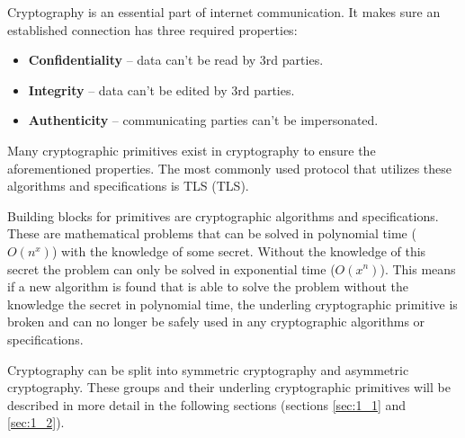 
Cryptography is an essential part of internet communication. It makes sure an established connection has three required properties\cite{Bernstein149}:
\begin{itemize}
  \item \textbf{Confidentiality} -- data can't be read by 3rd parties.
  \item \textbf{Integrity} -- data can't be edited by 3rd parties.
  \item \textbf{Authenticity} -- communicating parties can't be impersonated.
\end{itemize}
Many cryptographic primitives exist in cryptography to ensure the aforementioned properties. The most commonly used protocol that utilizes these algorithms and specifications is TLS (\acl{TLS}).

Building blocks for primitives are cryptographic algorithms and specifications. These are mathematical problems that can be solved in polynomial time ($O(n^x)$) with the knowledge of some secret. Without the knowledge of this secret the problem can only be solved in exponential time ($O(x^n)$). This means if a new algorithm is found that is able to solve the problem without the knowledge the secret in polynomial time, the underling cryptographic primitive is broken and can no longer be safely used in any cryptographic algorithms or specifications.\cite{Smart2004}

Cryptography can be split into symmetric cryptography and asymmetric cryptography. These groups and their underling cryptographic primitives will be described in more detail in the following sections (sections \ref{sec:1_1} and \ref{sec:1_2}).


